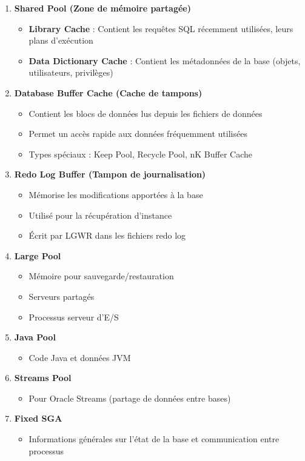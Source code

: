 \documentclass[12pt,a4paper]{article}
\begin{document}
\begin{enumerate}
    \item \textbf{Shared Pool (Zone de mémoire partagée)}
    \begin{itemize}
        \item \textbf{Library Cache} : Contient les requêtes SQL récemment utilisées, leurs plans d'exécution
        \item \textbf{Data Dictionary Cache} : Contient les métadonnées de la base (objets, utilisateurs, privilèges)
    \end{itemize}
    
    \item \textbf{Database Buffer Cache (Cache de tampons)}
    \begin{itemize}
        \item Contient les blocs de données lus depuis les fichiers de données
        \item Permet un accès rapide aux données fréquemment utilisées
        \item Types spéciaux : Keep Pool, Recycle Pool, nK Buffer Cache
    \end{itemize}
    
    \item \textbf{Redo Log Buffer (Tampon de journalisation)}
    \begin{itemize}
        \item Mémorise les modifications apportées à la base
        \item Utilisé pour la récupération d'instance
        \item Écrit par LGWR dans les fichiers redo log
    \end{itemize}
    
    \item \textbf{Large Pool}
    \begin{itemize}
        \item Mémoire pour sauvegarde/restauration
        \item Serveurs partagés
        \item Processus serveur d'E/S
    \end{itemize}
    
    \item \textbf{Java Pool}
    \begin{itemize}
        \item Code Java et données JVM
    \end{itemize}
    
    \item \textbf{Streams Pool}
    \begin{itemize}
        \item Pour Oracle Streams (partage de données entre bases)
    \end{itemize}
    
    \item \textbf{Fixed SGA}
    \begin{itemize}
        \item Informations générales sur l'état de la base et communication entre processus
    \end{itemize}
\end{enumerate}
\end{document}
